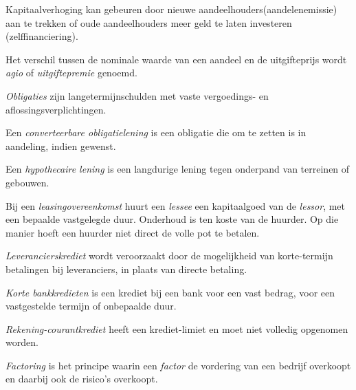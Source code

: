 \documentclass[../../samenvatting.tex]{subfiles}
\begin{document}
Kapitaalverhoging kan gebeuren door nieuwe aandeelhouders(aandelenemissie) aan te trekken of oude aandeelhouders meer geld te laten investeren (zelffinanciering).

Het verschil tussen de nominale waarde van een aandeel en de uitgifteprijs wordt \emph{agio} of \emph{uitgiftepremie} genoemd.

\emph{Obligaties} zijn langetermijnschulden met vaste vergoedings- en aflossingsverplichtingen. 

Een \emph{converteerbare obligatielening} is een obligatie die om te zetten is in aandeling, indien gewenst. 

Een \emph{hypothecaire lening} is een langdurige lening tegen onderpand van terreinen of gebouwen. 

Bij een \emph{leasingovereenkomst} huurt een \emph{lessee} een kapitaalgoed van de \emph{lessor}, met een bepaalde vastgelegde duur. Onderhoud is ten koste van de huurder. Op die manier hoeft een huurder niet direct de volle pot te betalen.

\emph{Leverancierskrediet} wordt veroorzaakt door de mogelijkheid van korte-termijn betalingen bij leveranciers, in plaats van directe betaling.

\emph{Korte bankkredieten} is een krediet bij een bank voor een vast bedrag, voor een vastgestelde termijn of onbepaalde duur.

\emph{Rekening-courantkrediet} heeft een krediet-limiet en moet niet volledig opgenomen worden.

\emph{Factoring} is het principe waarin een \emph{factor} de vordering van een bedrijf overkoopt en daarbij ook de risico's overkoopt.
\end{document}
